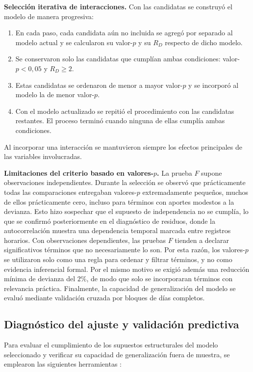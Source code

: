 \documentclass[12pt, a4paper]{article}
\numberwithin{equation}{section}
\begin{document}
\textbf{Selección iterativa de interacciones.} Con las candidatas se construyó el modelo de manera progresiva:
\begin{enumerate}
\item En cada paso, cada candidata aún no incluida se agregó por separado al modelo actual y se calcularon su valor-$p$ y su $R_D$ respecto de dicho modelo.
\item Se conservaron solo las candidatas que cumplían ambas condiciones: valor-$p<0{,}05$ y $R_D\geq 2$.
\item Estas candidatas se ordenaron de menor a mayor valor-$p$ y se incorporó al modelo la de menor valor-$p$.
\item Con el modelo actualizado se repitió el procedimiento con las candidatas restantes. El proceso terminó cuando ninguna de ellas cumplía ambas condiciones.
\end{enumerate}
Al incorporar una interacción se mantuvieron siempre los efectos principales de las variables involucradas.

\textbf{Limitaciones del criterio basado en valores-$p$.} La prueba $F$ supone observaciones independientes. Durante la selección se observó que prácticamente todas las comparaciones entregaban valores-$p$ extremadamente pequeños, muchos de ellos prácticamente cero, incluso para términos con aportes modestos a la devianza. Esto hizo sospechar que el supuesto de independencia no se cumplía, lo que se confirmó posteriormente en el diagnóstico de residuos, donde la autocorrelación muestra una dependencia temporal marcada entre registros horarios. Con observaciones dependientes, las pruebas $F$ tienden a declarar significativos términos que no necesariamente lo son. Por esta razón, los valores-$p$ se utilizaron solo como una regla para ordenar y filtrar términos, y no como evidencia inferencial formal. Por el mismo motivo se exigió además una reducción mínima de devianza del $2\%$, de modo que solo se incorporaran términos con relevancia práctica. Finalmente, la capacidad de generalización del modelo se evaluó mediante validación cruzada por bloques de días completos.
\newpage

\subsection{Diagnóstico del ajuste y validación predictiva}
Para evaluar el cumplimiento de los supuestos estructurales del modelo seleccionado y verificar su capacidad de generalización fuera de muestra, se emplearon las siguientes herramientas \cite{dunn}:
\end{document}

